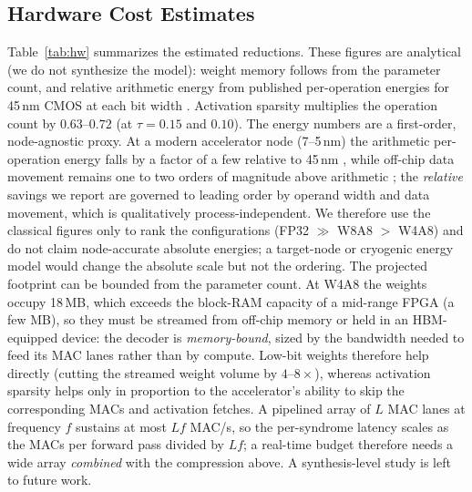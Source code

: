 ﻿\documentclass[conference]{IEEEtran}
\begin{document}
\subsection{Hardware Cost Estimates}
Table~\ref{tab:hw} summarizes the estimated reductions. These figures are
analytical (we do not synthesize the model): weight memory follows from the
parameter count, and relative arithmetic energy from published
per-operation energies for 45\,nm CMOS at each bit width \cite{horowitz}.
Activation sparsity multiplies the operation count by $0.63$--$0.72$
(at $\tau{=}0.15$ and $0.10$).
The energy numbers are a first-order, node-agnostic proxy. At a modern
accelerator node (7--5\,nm) the arithmetic per-operation energy falls by a
factor of a few relative to 45\,nm \cite{sze2017,agrawal2021}, while
off-chip data movement remains one to two orders of magnitude above
arithmetic \cite{horowitz,sze2017}; the \emph{relative} savings we report
are governed to leading order by operand width and data movement, which is
qualitatively process-independent. We therefore use the classical figures
only to rank the configurations (FP32 $\gg$ W8A8 $>$ W4A8) and do not
claim node-accurate absolute energies; a target-node or cryogenic energy
model would change the absolute scale but not the ordering.
The projected footprint can be bounded from the
parameter count. At W4A8 the weights occupy 18\,MB, which
exceeds the block-RAM capacity of a mid-range FPGA (a few MB), so they must
be streamed from off-chip memory or held in an HBM-equipped device: the
decoder is \emph{memory-bound}, sized by the bandwidth needed to feed its
MAC lanes rather than by compute. Low-bit weights therefore help directly
(cutting the streamed weight volume by $4$--$8\times$), whereas activation
sparsity helps only in proportion to the accelerator's ability to skip the
corresponding MACs and activation fetches. A pipelined array of $L$ MAC
lanes at frequency $f$ sustains at most $Lf$ MAC/s, so the per-syndrome
latency scales as the MACs per forward pass divided by $Lf$; a real-time
budget therefore needs a wide array \emph{combined} with the compression
above. A synthesis-level study is left to future work.
\begin{table}[t]
\caption{Analytical hardware cost estimates relative to the FP32
reference. Weight memory follows from the 35.98M-parameter count; relative
arithmetic energy uses published per-MAC energies \cite{horowitz};
sparsity multiplies the operation count by $0.63$--$0.72$. Estimates only,
not measured device figures.}
\label{tab:hw}
\centering
\footnotesize
{}
\end{table}
\end{document}
